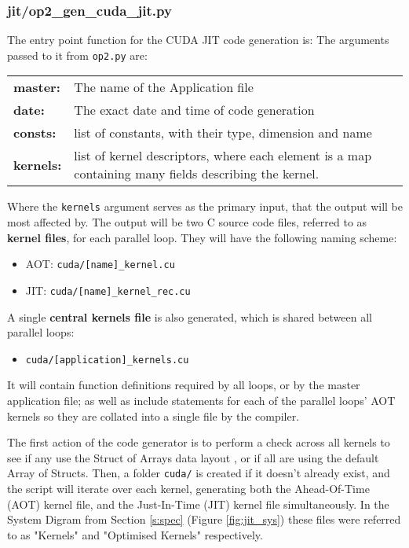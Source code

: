 \subsubsection{jit/op2\_gen\_cuda\_jit.py}
The entry point function for the CUDA JIT code generation is:
\noindent The arguments passed to it from \verb|op2.py| are:
\begin{center}
\begin{tabular}{>{\bfseries}l l}
master: & The name of the Application file \\[\medskipamount]
date: & The exact date and time of code generation \\[\medskipamount]
consts: & list of constants, with their type, dimension and name \\[\medskipamount]
kernels: & \parbox[t]{.8\textwidth}{list of kernel descriptors, where each element is a map containing many fields describing the kernel.} \\[\medskipamount]
\end{tabular}
\end{center}
\vspace{1em}
\noindent Where the \verb|kernels| argument serves as the primary input, that the output will be most affected by. The output will be two C source code files, referred to as \textbf{kernel files}, for each parallel loop. They will have the following naming scheme:
\begin{itemize}
\vspace{-.5em}
\item{AOT: \verb|cuda/[name]_kernel.cu|}
\vspace{-.5em}
\item{JIT: \verb|cuda/[name]_kernel_rec.cu|}
\end{itemize}
A single \textbf{central kernels file} is also generated, which is shared between all parallel loops:
\begin{itemize}
\vspace{-.5em}
\item{\verb|cuda/[application]_kernels.cu|}
\end{itemize}
It will contain function definitions required by all loops, or by the master application file; as well as include statements for each of the parallel loops' AOT kernels so they are collated into a single file by the compiler.
\par
The first action of the code generator is to perform a check across all kernels to see if any use the Struct of Arrays data layout \cite[p13]{manual}, or if all are using the default Array of Structs. Then, a folder \verb|cuda/| is created if it doesn't already exist, and the script will iterate over each kernel, generating both the Ahead-Of-Time (AOT) kernel file, and the Just-In-Time (JIT) kernel file simultaneously. In the System Digram from Section \ref{s:spec} (Figure \ref{fig:jit_sys}) these files were referred to as "Kernels" and "Optimised Kernels" respectively.

